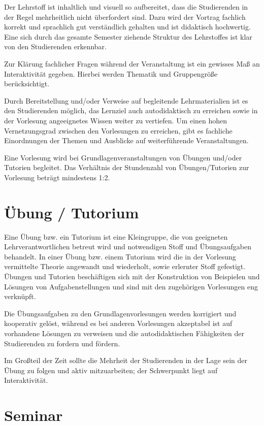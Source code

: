 Der Lehrstoff ist inhaltlich und visuell so aufbereitet, dass die Studierenden in der Regel mehrheitlich nicht überfordert sind. Dazu wird der Vortrag fachlich korrekt und sprachlich gut verständlich gehalten und ist didaktisch hochwertig. Eine sich durch das gesamte Semester ziehende Struktur des Lehrstoffes ist klar von den Studierenden erkennbar.

Zur Klärung fachlicher Fragen während der Veranstaltung ist ein gewisses Maß an Interaktivität gegeben. Hierbei werden Thematik und Gruppengröße berücksichtigt.

Durch Bereitstellung und/oder Verweise auf begleitende Lehrmaterialien ist es den Studierenden möglich, das Lernziel auch autodidaktisch zu erreichen sowie in der Vorlesung angeeignetes Wissen weiter zu vertiefen. Um einen hohen Vernetzungsgrad zwischen den Vorlesungen zu erreichen, gibt es fachliche Einordnungen der Themen und Ausblicke auf weiterführende Veranstaltungen.

Eine Vorlesung wird bei Grundlagenveranstaltungen von Übungen und/oder Tutorien begleitet. Das Verhältnis der Stundenzahl von Übungen/Tutorien zur Vorlesung beträgt mindestens 1:2.

\section{Übung / Tutorium}

Eine Übung bzw. ein Tutorium ist eine Kleingruppe, die von geeigneten Lehrverantwortlichen betreut wird und notwendigen Stoff und Übungsaufgaben behandelt. In einer Übung bzw. einem Tutorium wird die in der Vorlesung vermittelte Theorie angewandt und wiederholt, sowie erlernter Stoff gefestigt. Übungen und Tutorien beschäftigen sich mit der Konstruktion von Beispielen und Lösungen von Aufgabenstellungen und sind mit den zugehörigen Vorlesungen eng verknüpft.

Die Übungsaufgaben zu den Grundlagenvorlesungen werden korrigiert und kooperativ gelöst, während es bei anderen Vorlesungen akzeptabel ist auf vorhandene Lösungen zu verweisen und die autodidaktischen Fähigkeiten der Studierenden zu fordern und fördern.

Im Großteil der Zeit sollte die Mehrheit der Studierenden in der Lage sein der Übung zu folgen und aktiv mitzuarbeiten; der Schwerpunkt liegt auf Interaktivität.

\section{Seminar}

